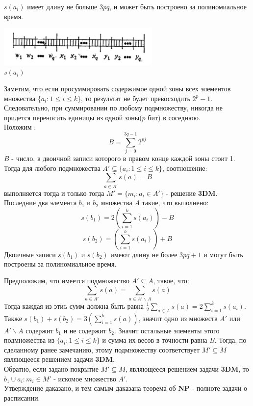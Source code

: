 \documentclass[10pt]{article}
\begin{document}
\begin{enumerate}
    $s(a_i)$ имеет длину не больше $3pq$, и может быть построено за полиномиальное время.
    \begin{center}
        \includegraphics[height=2cm]{img1.png} \\ $s(a_i)$
    \end{center}
    Заметим, что если просуммировать содержимое одной зоны всех элементов множества $\{a_i: 1 \leq i \leq k\}$, то результат не будет превосходить $2^p - 1$. Следовательно, при суммировании по любому подмножеству, никогда не придется переносить единицы из одной зоны($p$ бит) в соседнюю. \\
    Положим :
    \begin{equation}
        B = \sum^{3q-1}_{j=0} 2^{pj}
    \end{equation}
    $B$ - число, в двоичной записи которого в правом конце каждой зоны стоит 1. Тогда для любого подмножества 
    $A' \subseteq \{a_i: 1 \leq i \leq k\}$, соотношение: 
    \begin{equation}
        \sum_{a \in A'} s(a) = B
    \end{equation}
    выполняется тогда и только тогда $M' = \{m_i :a_i \in A'\}$ - решение \textbf{3DM}.
    Последние два элемента $b_1$ и $b_2$ множества $A$ такие, что выполнено:
    \begin{equation}
        s(b_1) = 2 \left( \sum^{k}_{i=1}s(a_i) \right) - B
    \end{equation}
    \begin{equation}
        s(b_2) = \left( \sum^{k}_{i=1}s(a_i) \right) + B
    \end{equation}
    Двоичные записи $s(b_1)$ и $s(b_2)$ имеют длину не более $3pq + 1$ и могут быть построены за полиномиальное время.

    Предположим, что имеется подмножество $A' \subseteq A$, такое, что: 
    \begin{equation}
        \sum_{a \in A'} s(a) = \sum_{a \in A' \backslash A} s(a)
    \end{equation}
    Тогда каждая из этиъ сумм должна быть равна $\frac{1}{2} \sum_{a \in A} s(a) = 2 \sum^{k}_{i=1} s(a_i)$.
    Также $s(b_1) + s(b_2) = 3 \left(\sum^{k}_{i=1} s(a) \right)$, значит одно из множеств $A'$ или 
    $A' \backslash A$ содержит $b_1$ и не содержит $b_2$. Значит остальные элементы этого подмножества из $\{a_i: 1 \leq i \leq k \}$ и сумма их весов в точности равна $B$. Тогда, по сделанному ранее замечанию, этому подмножеству соответствует $M' \subseteq M$ являющееся решением задачи \textbf{3DM}. \\ 
    Обратно, если задано покрытие $M' \subseteq M$, являющееся решением задачи \textbf{3DM}, то ${b_1} \cup {a_i:m_i \in M'}$ - искомое множество $A'$. \\
    Утверждение даказано, и тем самым даказана теорема об \textbf{NP} - полноте задачи о расписании.




\end{enumerate}
\end{document}
